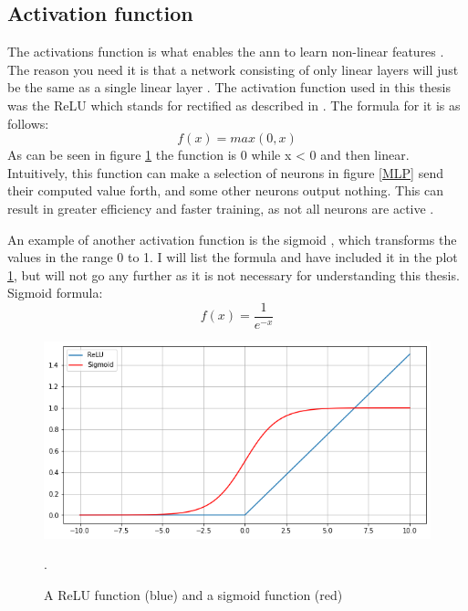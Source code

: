     \subsection{Activation function} \label{activation function}
        The activations function is what enables the \gls{ann} to learn non-linear features \cite{razavi2021deep_exp_per}. The reason you need it is that a network consisting of only linear layers will just be the same as a single linear layer \cite{razavi2021deep_exp_per}. The activation function used in this thesis was the ReLU which stands for rectified as described in \cite{sharma2019new_activation_func}. The formula for it is as follows:
            \begin{equation} \label{relu_eq}
                f(x) = max(0,x)
            \end{equation}
        As can be seen in figure \ref{activation_fig} the function is 0 while x < 0 and then linear. Intuitively, this function can make a selection of neurons in figure \ref{MLP} send their computed value forth, and some  other neurons output nothing. This can result in greater efficiency and faster training, as not all neurons are active \cite{sharma2019new_activation_func}.
        
        An example of another activation function is the sigmoid \cite{sharma2019new_activation_func}, which transforms the values in the range 0 to 1. I will list the formula and have included it in the plot \ref{activation_fig}, but will not go any further as it is not necessary for understanding this thesis. Sigmoid formula:
            \begin{equation} \label{sigmoid_eq}
                f(x) = \dfrac{1}{e^{-x}} 
            \end{equation}
            
            \begin{figure}[H]
                \centering
                \includegraphics[scale=0.5]{figures/activation.png}
                \caption{A ReLU function (blue) and a sigmoid function (red)}.
              	\medskip 
                \label{activation_fig}
            \end{figure}

